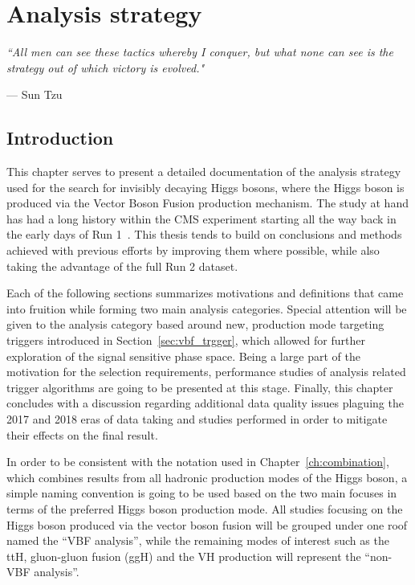 \chapter{Analysis strategy}
\label{ch:an_strategy}
\epigraph{\itshape``All men can see these tactics whereby I conquer, but what none can see is the strategy out of which victory is evolved."}{--- \textup{Sun Tzu}}

\section{Introduction}
\hspace{10pt}This chapter serves to present a detailed documentation of the analysis strategy used for the search for invisibly decaying Higgs bosons, where the Higgs boson is produced via the Vector Boson Fusion production mechanism. The study at hand has had a long history within the CMS experiment starting all the way back in the early days of Run 1~\cite{paper:HIG_17_023}. This thesis tends to build on conclusions and methods achieved with previous efforts by improving them where possible, while also taking the advantage of the full Run 2 dataset.

\hspace{10pt} Each of the following sections summarizes motivations and definitions that came into fruition while forming two main analysis categories. Special attention will be given to the analysis category based around new, production mode targeting triggers introduced in Section~\ref{sec:vbf_trgger}, which allowed for further exploration of the signal sensitive phase space. Being a large part of the motivation for the selection requirements, performance studies of analysis related trigger algorithms are going to be presented at this stage. Finally, this chapter concludes with a discussion regarding additional data quality issues plaguing the 2017 and 2018 eras of data taking and studies performed in order to mitigate their effects on the final result.

\hspace{10pt} In order to be consistent with the notation used in Chapter~\ref{ch:combination}, which combines results from all hadronic production modes of the Higgs boson, a simple naming convention is going to be used based on the two main focuses in terms of the preferred Higgs boson production mode. All studies focusing on the Higgs boson produced via the vector boson fusion will be grouped under one roof named the ``VBF analysis'', while the remaining modes of interest such as the ttH, gluon-gluon fusion (ggH) and the VH production will represent the ``non-VBF analysis''.

